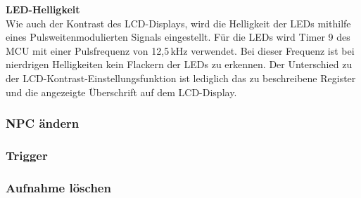 \textbf{LED-Helligkeit}\\
Wie auch der Kontrast des LCD-Displays, wird die Helligkeit der LEDs mithilfe eines Pulsweitenmodulierten Signals eingestellt. Für die LEDs wird Timer 9 des MCU mit einer Pulsfrequenz von 12,5\,kHz verwendet. Bei dieser Frequenz ist bei nierdrigen Helligkeiten kein Flackern der LEDs zu erkennen. Der Unterschied zu der LCD-Kontrast-Einstellungsfunktion ist lediglich das zu beschreibene Register und die angezeigte Überschrift auf dem LCD-Display.
\subsubsection{NPC ändern}
\subsubsection{Trigger}
\subsubsection{Aufnahme löschen}